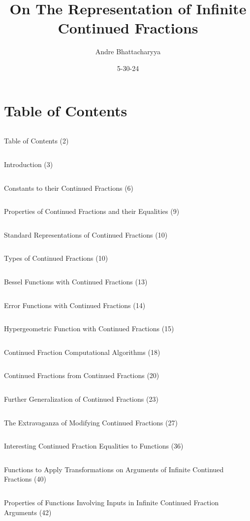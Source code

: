 \documentclass{article}
\title{On The Representation of Infinite Continued Fractions}
\author{Andre Bhattacharyya}
\date{5-30-24}
\begin{document}
\maketitle

\newpage

\section{Table of Contents}

$${}$$

Table of Contents (2)

$${}$$

Introduction (3)

$${}$$

Constants to their Continued Fractions (6)

$${}$$

Properties of Continued Fractions and their Equalities (9)

$${}$$

Standard Representations of Continued Fractions (10)

$${}$$

Types of Continued Fractions (10)

$${}$$

Bessel Functions with Continued Fractions (13)

$${}$$

Error Functions with Continued Fractions (14)

$${}$$

Hypergeometric Function with Continued Fractions (15)

$${}$$

Continued Fraction Computational Algorithms (18)

$${}$$

Continued Fractions from Continued Fractions (20)

$${}$$

Further Generalization of Continued Fractions (23)

$${}$$

The Extravaganza of Modifying Continued Fractions (27)

$${}$$

Interesting Continued Fraction Equalities to Functions (36)

$${}$$

Functions to Apply Transformations on Arguments of Infinite Continued Fractions (40)

$${}$$

Properties of Functions Involving Inputs in Infinite Continued Fraction Arguments (42)
\end{document}
